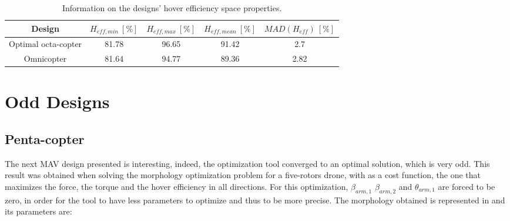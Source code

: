\begin{table}[!ht]
\begin{center}
 \caption{Information on the designs’ torque space properties.}\vspace{1ex}
 \label{tab:tab_Octa_compare_torque}
\end{center}
\end{table}

\begin{table}[!ht]
\begin{center}
 \caption{Information on the designs’ hover efficiency space properties.}\vspace{1ex}
 \label{tab:tab_Octa_compare_hover}
 {\scriptsize\begin{tabular}{|c|cccc|}
 \hline
  Design & $H_{eff,min}\ [\%]$ & $H_{eff,max}\ [\%]$ & $H_{eff,mean}\ [\%]$
  & $MAD(H_{eff})\ [\%]$\\ \hline
  Optimal octa-copter & 81.78 & 96.65 & 91.42 & 2.7\\
  Omnicopter & 81.64 & 94.77 & 89.36 & 2.82\\
 \hline
\end{tabular}}
\end{center}
\end{table}

\section{Odd Designs}
\label{sec:odd_designs}

\subsection{Penta-copter}
\label{sec:penta_copter}

The next MAV design presented is interesting, indeed, the optimization tool
converged to an optimal solution, which is very odd. This result was obtained
when solving the morphology optimization problem for a five-rotors drone,
with as a cost function, the one that maximizes the force, the torque and the
hover efficiency in all directions. For this optimization, $\beta_{arm,1}$
$\beta_{arm,2}$ and $\theta_{arm,1}$ are forced to be zero,
in order for the tool to have less parameters to optimize and thus to be more
precise. The morphology obtained is represented in 
and its parameters are:


